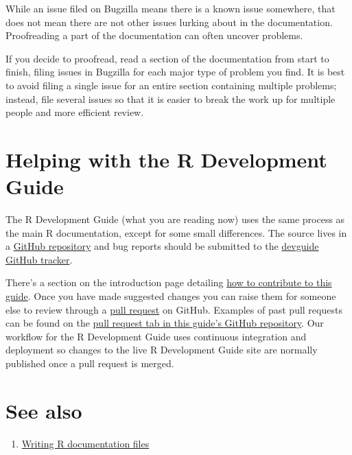 \documentclass[
]{book}
\providecommand{\tightlist}{%
  \setlength{\itemsep}{0pt}\setlength{\parskip}{0pt}}
\begin{document}
While an issue filed on Bugzilla means there is a known issue somewhere, that does not mean there are not other issues lurking about in the documentation. Proofreading a part of the documentation can often uncover problems.

If you decide to proofread, read a section of the documentation from start to finish, filing issues in Bugzilla for each major type of problem you find. It is best to avoid filing a single issue for an entire section containing multiple problems; instead, file several issues so that it is easier to break the work up for multiple people and more efficient review.

\section{Helping with the R Development Guide}\label{helping-with-the-r-development-guide}

The R Development Guide (what you are reading now) uses the same process as the main R documentation, except for some small differences. The source lives in a \href{https://github.com/r-devel/rdevguide/}{GitHub repository} and bug reports should be submitted to the \href{https://github.com/r-devel/rdevguide/issues}{devguide GitHub tracker}.

There's a section on the introduction page detailing \hyperref[how-to-contribute-to-this-guide]{how to contribute to this guide}. Once you have made suggested changes you can raise them for someone else to review through a \href{https://docs.github.com/en/pull-requests/collaborating-with-pull-requests/proposing-changes-to-your-work-with-pull-requests/about-pull-requests}{pull request} on GitHub. Examples of past pull requests can be found on the \href{https://github.com/r-devel/rdevguide/pulls?q=is\%3Apr+is\%3Aclosed}{pull request tab in this guide's GitHub repository}.
Our workflow for the R Development Guide uses continuous integration and deployment so changes to the live R Development Guide site are normally published once a pull request is merged.

\section{See also}\label{see-also-5}

\begin{enumerate}
\def\labelenumi{\arabic{enumi}.}
\tightlist
\item
  \href{https://cran.r-project.org/doc/manuals/r-release/R-exts.html\#Writing-R-documentation-files}{Writing R documentation files}
\end{enumerate}
\end{document}
